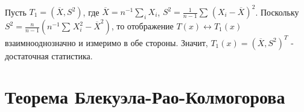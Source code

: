 \begin{itemize}
$$\begin{gathered}
		\end{gathered}$$
		Пусть $\displaystyle T_1 = \left( \overline{X}, S^2 \right)$, где $\displaystyle \overline{X} = n^{-1} \underset{i}{\overset{}{\sum}}X_i$, $\displaystyle S^2 = \frac{1}{n-1} \underset{}{\overset{}{\sum}}(X_i - \overline{X})^2$. Поскольку $\displaystyle S^2 = \frac{n}{n-1} \left( n^{-1}\underset{}{\overset{}{\sum}}X_i^2 - \overline{X}^2 \right)$, то отображение $T(x) \leftrightarrow T_1 (x)$ взаимнооднозначно и измеримо в обе стороны. Значит, $\displaystyle T_1 (x) = \left( \overline{X}, S^2 \right)^T$ - достаточная статистика.
\end{itemize}

\section{Теорема Блекуэла-Рао-Колмогорова}\label{cha:7/sec:3}

